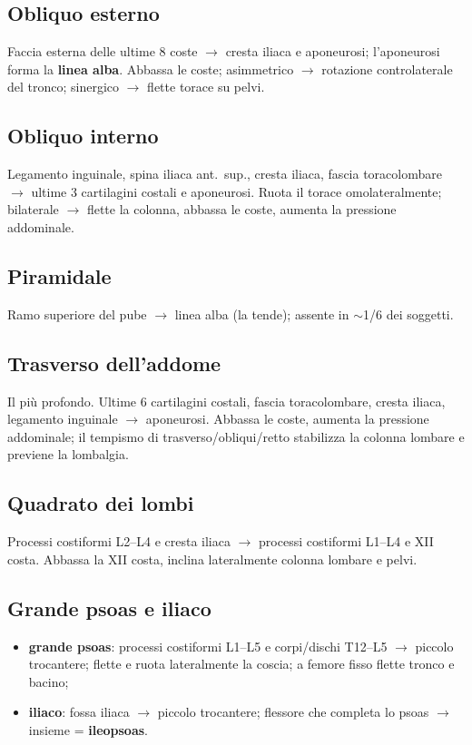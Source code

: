 \subsection{Obliquo esterno}
Faccia esterna delle ultime 8 coste $\rightarrow$ cresta iliaca e aponeurosi; l'aponeurosi forma la
\textbf{linea alba}. Abbassa le coste; asimmetrico $\rightarrow$ rotazione controlaterale del tronco;
sinergico $\rightarrow$ flette torace su pelvi.

\subsection{Obliquo interno}
Legamento inguinale, spina iliaca ant.\ sup., cresta iliaca, fascia toracolombare $\rightarrow$
ultime 3 cartilagini costali e aponeurosi. Ruota il torace omolateralmente; bilaterale $\rightarrow$
flette la colonna, abbassa le coste, aumenta la pressione addominale.

\subsection{Piramidale}
Ramo superiore del pube $\rightarrow$ linea alba (la tende); assente in $\sim$1/6 dei soggetti.

\subsection{Trasverso dell'addome}
Il più profondo. Ultime 6 cartilagini costali, fascia toracolombare, cresta iliaca, legamento
inguinale $\rightarrow$ aponeurosi. Abbassa le coste, aumenta la pressione addominale; il tempismo
di trasverso/obliqui/retto stabilizza la colonna lombare e previene la lombalgia.

\subsection{Quadrato dei lombi}
Processi costiformi L2--L4 e cresta iliaca $\rightarrow$ processi costiformi L1--L4 e XII costa.
Abbassa la XII costa, inclina lateralmente colonna lombare e pelvi.

\subsection{Grande psoas e iliaco}
\begin{itemize}
  \item \textbf{grande psoas}: processi costiformi L1--L5 e corpi/dischi T12--L5 $\rightarrow$
    piccolo trocantere; flette e ruota lateralmente la coscia; a femore fisso flette tronco e bacino;
  \item \textbf{iliaco}: fossa iliaca $\rightarrow$ piccolo trocantere; flessore che completa lo
    psoas $\rightarrow$ insieme = \textbf{ileopsoas}.
\end{itemize}

